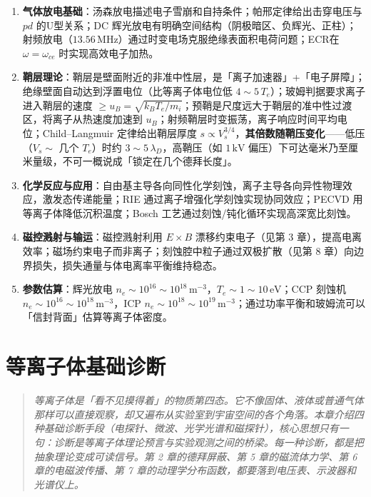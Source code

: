\documentclass[12pt,a4paper,openany,oneside]{book}
\begin{document}
\begin{chapterreview}
\begin{enumerate}
\item \textbf{气体放电基础}：汤森放电描述电子雪崩和自持条件；帕邢定律给出击穿电压与 $pd$ 的U型关系；DC 辉光放电有明确空间结构（阴极暗区、负辉光、正柱）；射频放电（$13.56\,\mathrm{MHz}$）通过时变电场克服绝缘表面积电荷问题；ECR在 $\omega = \omega_{ce}$ 时实现高效电子加热。

\item \textbf{鞘层理论}：鞘层是壁面附近的非准中性层，是「离子加速器」+「电子屏障」；绝缘壁面自动达到浮置电位（比等离子体电位低 $4\sim 5\,T_e$）；玻姆判据要求离子进入鞘层的速度 $\ge u_B = \sqrt{k_B T_e/m_i}$；预鞘是尺度远大于鞘层的准中性过渡区，将离子从热速度加速到 $u_B$；射频鞘层时变振荡，离子响应时间平均电位；Child--Langmuir 定律给出鞘层厚度 $s \propto V_s^{3/4}$，\textbf{其倍数随鞘压变化}——低压（$V_s\sim$ 几个 $T_e$）时约 $3\sim 5\,\lambda_D$，高鞘压（如 $1\,\mathrm{kV}$ 偏压）下可达毫米乃至厘米量级，不可一概说成「锁定在几个德拜长度」。

\item \textbf{化学反应与应用}：自由基主导各向同性化学刻蚀，离子主导各向异性物理效应，激发态传递能量；RIE 通过离子增强化学刻蚀实现协同效应；PECVD 用等离子体降低沉积温度；Bosch 工艺通过刻蚀/钝化循环实现高深宽比刻蚀。

\item \textbf{磁控溅射与输运}：磁控溅射利用 $E\times B$ 漂移约束电子（见第 3 章），提高电离效率；磁场约束电子而非离子；刻蚀腔中粒子通过双极扩散（见第 8 章）向边界损失，损失通量与体电离率平衡维持稳态。

\item \textbf{参数估算}：辉光放电 $n_e \sim 10^{16}\sim 10^{18}\,\mathrm{m^{-3}}$，$T_e \sim 1\sim 10\,\mathrm{eV}$；CCP 刻蚀机 $n_e \sim 10^{16}\sim 10^{18}\,\mathrm{m^{-3}}$，ICP $n_e \sim 10^{18}\sim 10^{19}\,\mathrm{m^{-3}}$；通过功率平衡和玻姆流可以「信封背面」估算等离子体密度。
\end{enumerate}
\end{chapterreview}

\newpage

\chapter{等离子体基础诊断}\label{ch:12}

\begin{quotation}
\itshape\small
等离子体是「看不见摸得着」的物质第四态。它不像固体、液体或普通气体那样可以直接观察，却又遍布从实验室到宇宙空间的各个角落。本章介绍四种基础诊断手段（电探针、微波、光学光谱和磁探针），核心思想只有一句：\emph{诊断是等离子体理论预言与实验观测之间的桥梁}。每一种诊断，都是把抽象理论变成可读信号。第 2 章的德拜屏蔽、第 5 章的磁流体力学、第 6 章的电磁波传播、第 7 章的动理学分布函数，都要落到电压表、示波器和光谱仪上。
\end{quotation}
\end{document}
